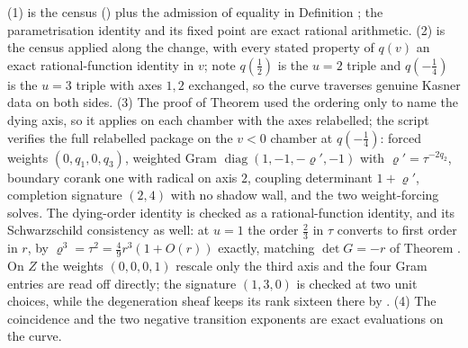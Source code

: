 (1) is the census () plus the admission of equality in Definition ; the parametrisation identity and its fixed point are exact rational arithmetic. (2) is the census applied along the change, with every stated property of $q(v)$ an exact rational-function identity in $v$; note $q(\tfrac12)$ is the $u=2$ triple and $q(-\tfrac14)$ is the $u=3$ triple with axes $1,2$ exchanged, so the curve traverses genuine Kasner data on both sides. (3) The proof of Theorem  used the ordering only to name the dying axis, so it applies on each chamber with the axes relabelled; the script verifies the full relabelled package on the $v<0$ chamber at $q(-\tfrac14)$: forced weights $(0,q_1,0,q_3)$, weighted Gram $\operatorname{diag}(1,-1,-\varrho',-1)$ with $\varrho' = \tau^{-2q_2}$, boundary corank one with radical on axis $2$, coupling determinant $1+\varrho'$, completion signature $(2,4)$ with no shadow wall, and the two weight-forcing solves. The dying-order identity is checked as a rational-function identity, and its Schwarzschild consistency as well: at $u=1$ the order $\tfrac23$ in $\tau$ converts to first order in $r$, by $\varrho^3 = \tau^2 = \tfrac49 r^3(1 + O(r))$ exactly, matching $\det G = -r$ of Theorem . On $Z$ the weights $(0,0,0,1)$ rescale only the third axis and the four Gram entries are read off directly; the signature $(1,3,0)$ is checked at two unit choices, while the degeneration sheaf keeps its rank sixteen there by . (4) The coincidence and the two negative transition exponents are exact evaluations on the curve.
